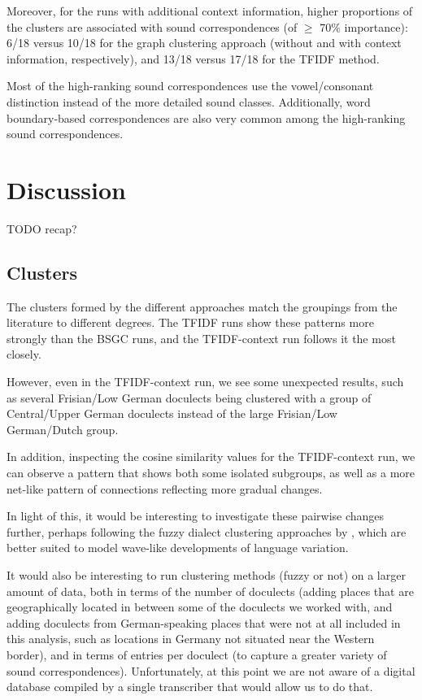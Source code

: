 \documentclass[a4paper]{article}
\begin{document}
Moreover, for the runs with additional context information,
higher proportions of the clusters are associated with
sound correspondences (of $\geq$ 70\% importance):
6/18 versus 10/18 for the graph clustering approach
(without and with context information, respectively),
and 13/18 versus 17/18 for the TFIDF method.

Most of the high-ranking sound correspondences
use the vowel/consonant distinction instead of
the more detailed sound classes.
Additionally, word boundary-based correspondences are also very common
among the high-ranking sound correspondences.

\section{Discussion}
\label{sec:discussion}

TODO recap?

\subsection{Clusters}
The clusters formed by the different approaches
match the groupings from the literature to different degrees.
The TFIDF runs show these patterns more strongly than the BSGC runs,
and the TFIDF-context run follows it the most closely.

However, even in the TFIDF-context run,
we see some unexpected results,
such as several Frisian/Low German doculects
being clustered with a group of Central/Upper German doculects
instead of the large Frisian/Low German/Dutch group.

In addition, inspecting the cosine similarity values
for the TFIDF-context run, we can observe a pattern
that shows both some isolated subgroups, as well as
a more net-like pattern of connections
reflecting more gradual changes.

In light of this, it would be interesting
to investigate these pairwise changes further,
perhaps following the fuzzy dialect clustering approaches
by \citet{proell2013detecting}, which are better suited to model
wave-like developments of language variation.

It would also be interesting to run clustering
methods (fuzzy or not) on a larger amount of data,
both in terms of the number of doculects
(adding places that are geographically located
in between some of the doculects we worked with,
and adding doculects from German-speaking places that
were not at all included in this analysis, such as
locations in Germany not situated near the Western border),
and in terms of entries per doculect
(to capture a greater variety of sound correspondences).
Unfortunately, at this point we are not aware of
a digital database compiled by a single transcriber that
would allow us to do that.
\end{document}
